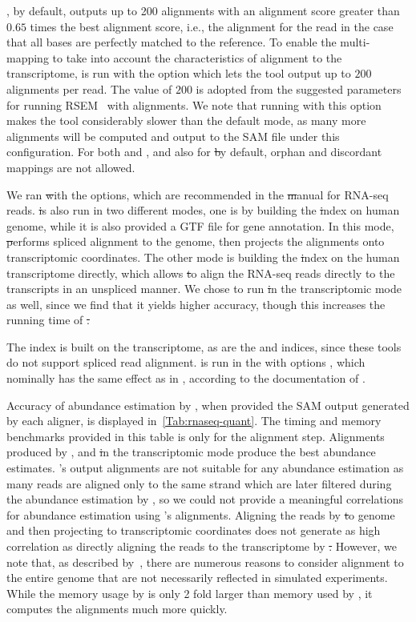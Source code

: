 \puffaligner, by default, outputs up to 200 alignments with an alignment score greater than $0.65$ times the 
best alignment score, i.e., the alignment for the read in the case that all bases are perfectly matched to the 
reference.
To enable the multi-mapping to take into account the characteristics of alignment to the transcriptome,
\bt is run with the option  which lets the tool output up to $200$ alignments per read. The 
value of $200$ is adopted from the suggested parameters for running RSEM~\citep{rsem} with \bt alignments. 
We note that running \bt with this option makes the tool considerably slower than the default mode, as many 
more alignments will be computed and output to the SAM file under this configuration.
For both \bt and \puffaligner, and also for \st by default, orphan and discordant mappings are not allowed.

We ran \st with the  options, which are recommended in the \st manual for RNA-seq reads.
\st is also run in two different modes, one is by building the \st index on human genome, while it is also 
provided a GTF file for gene annotation. In this mode, \st performs spliced alignment to the genome, then 
projects the alignments onto transcriptomic coordinates. The other mode is building the \st index on the 
human transcriptome directly, which allows \st to align the RNA-seq reads directly to the transcripts in an 
unspliced manner. We chose to run \st in the transcriptomic mode as well, since we find that it yields higher 
accuracy, though this increases the running time of \st.

The \debga index is built on the transcriptome, as are the \bt and \puffaligner indices, since these tools 
do not support spliced read alignment. \Ddebga is run in the with options , which nominally 
has the same effect as  in \bt, according to the documentation of \debga.

Accuracy of abundance estimation by \salmon, when provided the SAM output generated by each aligner, is 
displayed in~\cref{Tab:rnaseq-quant}. The timing and memory benchmarks provided in this table is only for the 
alignment step. Alignments produced by \puffaligner, \bt and \st in the transcriptomic mode produce the best 
abundance estimates. \Ddebga's output alignments are not suitable for any abundance estimation as many reads 
are aligned only to the same strand which are later filtered during the abundance estimation by \salmon, so 
we could not provide a meaningful correlations for abundance estimation using \debga's alignments.
Aligning the reads by \st to genome and then projecting to transcriptomic coordinates does not generate as 
high correlation as directly aligning the reads to the transcriptome by \st.  However, we note that, as 
described by~\citet{srivastava2019alignment}, there are numerous reasons to consider alignment to the 
entire genome that are not necessarily reflected in simulated experiments.
While the memory usage by \puffaligner is only 2 fold larger than memory used by \bt, it computes the 
alignments much more quickly. 


